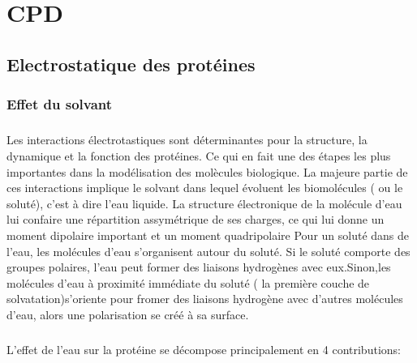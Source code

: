 
\chapter{CPD}
\label{chap:CPD}

\section{Electrostatique des protéines}
\subsection{Effet du solvant}
\paragraph{}
Les interactions électrotastiques sont déterminantes pour la structure, la dynamique et la fonction des protéines. Ce qui en fait une des étapes les plus importantes dans la modélisation des molècules biologique. La majeure partie de ces interactions implique le solvant dans lequel évoluent les biomolécules ( ou le soluté), c'est à dire l'eau liquide.
La structure électronique de la molécule d'eau lui confaire une répartition assymétrique de ses charges, ce qui lui donne un moment dipolaire important et un moment quadripolaire 
Pour un soluté dans de l'eau, les molécules d'eau s'organisent autour du soluté. Si le soluté comporte des groupes polaires, l'eau peut former des liaisons hydrogènes avec eux.Sinon,les molécules d'eau à proximité immédiate du soluté ( la première couche de solvatation)s'oriente pour fromer des liaisons hydrogène avec d'autres molécules d'eau, alors une polarisation se créé à sa surface.
\paragraph{}
L'effet de l'eau sur la protéine se décompose principalement en 4 contributions:

